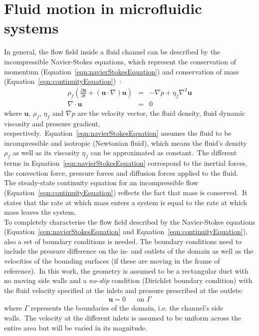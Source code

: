 \section{Fluid motion in microfluidic systems}\label{sec:fluidMotionInMicrofluidicSystems}
In general, the flow field inside a fluid channel can be described by the incompressible Navier-Stokes equations, which represent the conservation of momentum (Equation~\ref{eqn:navierStokesEquation}) and conservation of mass (Equation~\ref{eqn:continuityEquation})~\cite{Happel2012}:\
\begin{eqnarray}
	\rho_{f} \left( \frac{\partial\mathbf{u}}{\partial t} + (\mathbf{u}\cdot\nabla)\mathbf{u} \right) &=& -\nabla p + \eta_{f} \nabla^{2}\mathbf{u}  	
	\label{eqn:navierStokesEquation} \\
	\nabla \cdot \mathbf{u}&=& 0
	\label{eqn:continuityEquation}
\end{eqnarray}
where $\mathbf{u}$, $\rho_{f}$, $\eta_{f}$ and $\nabla p$ are the velocity vector, the fluid density, fluid dynamic viscosity and pressure gradient, respectively.\ Equation~\ref{eqn:navierStokesEquation} assumes the fluid to be incompressible and isotropic (Newtonian fluid), which means the fluid's density $\rho_f$ as well as its viscosity $\eta_{f}$ can be approximated as constant.\ The different terms in Equation~\ref{eqn:navierStokesEquation} correspond to the inertial forces, the convection force, pressure forces and diffusion forces applied to the fluid.\\
The steady-state continuity equation for an incompressible flow (Equation~\ref{eqn:continuityEquation}) reflects the fact that mass is conserved.\ It states that the rate at which mass enters a system is equal to the rate at which mass leaves the system.\\
To completely characterise the flow field described by the Navier-Stokes equations (Equation~\ref{eqn:navierStokesEquation} and Equation~\ref{eqn:continuityEquation}), also a set of boundary conditions is needed. The boundary conditions need to include the pressure difference on the in- and outlets of the domain as well as the velocities of the bounding surfaces (if these are moving in the frame of reference).\ In this work, the geometry is assumed to be a rectangular duct with no moving side walls and a \textit{no-slip} condition (Dirichlet boundary condition) with the fluid velocity specified at the inlets and pressure prescribed at the outlets:\
\begin{eqnarray}
	\mathbf{u} = 0 && \text{on $\Gamma$}
	\label{eqn:dirichletBoundaryCondition}
\end{eqnarray}
where $\Gamma$ represents the boundaries of the domain, i.e. the channel's side walls.\ The velocity at the different inlets is assumed to be uniform across the entire area but will be varied in its magnitude.\
%
